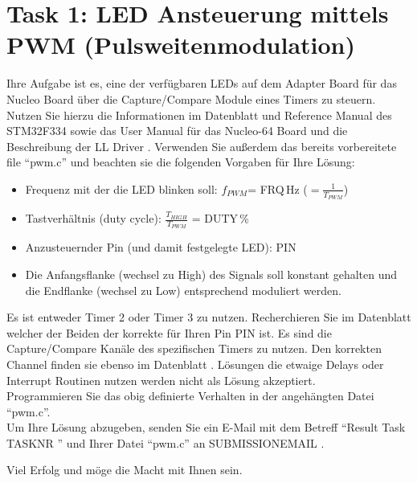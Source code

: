 \documentclass[a4paper,12pt]{article}
\begin{document}
\pagestyle{empty}
\setlength{\parindent}{0em}
\section*{Task 1: LED Ansteuerung mittels PWM (Pulsweitenmodulation)}

Ihre Aufgabe ist es, eine der verfügbaren LEDs auf dem Adapter Board für das Nucleo Board über die Capture/Compare Module eines Timers zu steuern. Nutzen Sie hierzu die Informationen im Datenblatt \cite{data_sheet} und Reference Manual \cite{ref_manual} des STM32F334 sowie das User Manual für das Nucleo-64 Board \cite{nucleo_manual} und die Beschreibung der LL Driver \cite{driver_manual}. Verwenden Sie außerdem das bereits vorbereitete file \enquote{pwm.c} und beachten sie die folgenden Vorgaben für Ihre Lösung:

\begin{itemize}
\item Frequenz mit der die LED blinken soll: $f_{PWM}$= {{FRQ}}\,Hz ($=\frac{1}{T_{PWM}}$)
\item Tastverh\"altnis (duty cycle):  $\frac{T_{HIGH}}{T_{PWM}}$ = {{DUTY}}\,\%
\item Anzusteuernder Pin (und damit festgelegte LED): {{PIN}}
\item Die Anfangsflanke (wechsel zu High) des Signals soll konstant gehalten und die Endflanke (wechsel zu Low) entsprechend moduliert werden.
\end{itemize}
\vspace{0.3cm}

Es ist entweder Timer 2 oder Timer 3 zu nutzen. Recherchieren Sie im Datenblatt \cite{data_sheet} welcher der Beiden der korrekte für Ihren Pin {{PIN}} ist. Es sind die Capture/Compare Kanäle des spezifischen Timers zu nutzen. Den korrekten Channel finden sie ebenso im Datenblatt \cite{data_sheet}. Lösungen die etwaige Delays oder Interrupt Routinen nutzen werden nicht als Lösung akzeptiert.
\\

Programmieren Sie das obig definierte Verhalten in der angeh\"angten Datei \enquote{pwm.c}.
\\

Um Ihre L\"osung abzugeben, senden Sie ein E-Mail mit dem Betreff \enquote{Result Task {{ TASKNR }}} und Ihrer Datei \enquote{pwm.c}  an {{ SUBMISSIONEMAIL }}.

\vspace{0.7cm}

Viel Erfolg und m\"oge die Macht mit Ihnen sein.

\printbibliography[heading=bibintoc]
\end{document}

